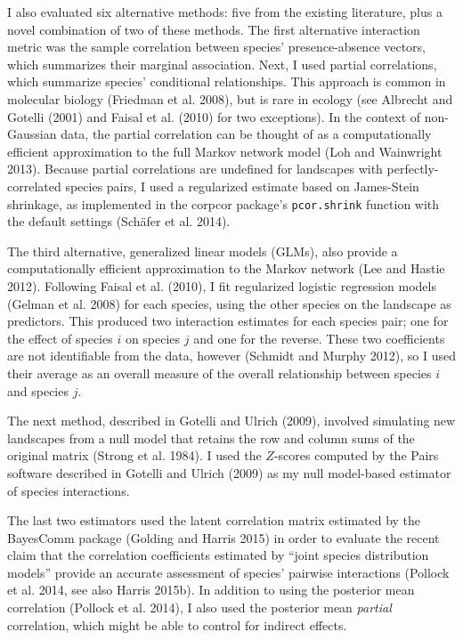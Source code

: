 \documentclass[12pt,]{article}
\begin{document}
\begin{spacing}{1.9}
\begin{flushleft}
I also evaluated six alternative methods: five from the existing
literature, plus a novel combination of two of these methods. The first
alternative interaction metric was the sample correlation between
species' presence-absence vectors, which summarizes their marginal
association. Next, I used partial correlations, which summarize species'
conditional relationships. This approach is common in molecular biology
(Friedman et al. 2008), but is rare in ecology (see Albrecht and Gotelli
(2001) and Faisal et al. (2010) for two exceptions). In the context of
non-Gaussian data, the partial correlation can be thought of as a
computationally efficient approximation to the full Markov network model
(Loh and Wainwright 2013). Because partial correlations are undefined
for landscapes with perfectly-correlated species pairs, I used a
regularized estimate based on James-Stein shrinkage, as implemented in
the corpcor package's \texttt{pcor.shrink} function with the default
settings (Schäfer et al. 2014).

The third alternative, generalized linear models (GLMs), also provide a
computationally efficient approximation to the Markov network (Lee and
Hastie 2012). Following Faisal et al. (2010), I fit regularized logistic
regression models (Gelman et al. 2008) for each species, using the other
species on the landscape as predictors. This produced two interaction
estimates for each species pair; one for the effect of species \(i\) on
species \(j\) and one for the reverse. These two coefficients are not
identifiable from the data, however (Schmidt and Murphy 2012), so I used
their average as an overall measure of the overall relationship between
species \(i\) and species \(j\).

The next method, described in Gotelli and Ulrich (2009), involved
simulating new landscapes from a null model that retains the row and
column sums of the original matrix (Strong et al. 1984). I used the
\(Z\)-scores computed by the Pairs software described in Gotelli and
Ulrich (2009) as my null model-based estimator of species interactions.

The last two estimators used the latent correlation matrix estimated by
the BayesComm package (Golding and Harris 2015) in order to evaluate the
recent claim that the correlation coefficients estimated by ``joint
species distribution models'' provide an accurate assessment of species'
pairwise interactions (Pollock et al. 2014, see also Harris 2015b). In
addition to using the posterior mean correlation (Pollock et al. 2014),
I also used the posterior mean \emph{partial} correlation, which might
be able to control for indirect effects.


\end{flushleft}
\end{spacing}
\end{document}

